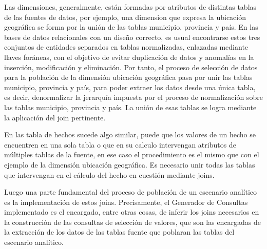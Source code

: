 Las dimensiones, generalmente, est\'an formadas por atributos de distintas tablas de las fuentes de datos, por 
ejemplo, una dimension que expresa la ubicación geográfica se forma por la uni\'on de las tablas municipio, 
provincia y pa\'is. En las bases de datos relacionales con un diseño correcto, es usual encontrarse estos 
tres conjuntos de entidades separados en tablas normalizadas, enlazadas mediante llaves for\'aneas, con el objetivo 
de evitar duplicación de datos y anomalías en la inserción, modificación y eliminación. Por tanto, el 
proceso de selección de datos para la población de la dimensión ubicación geográfica pasa por unir las 
tablas municipio, provincia y pa\'is, para poder extraer los datos desde una única tabla, es 
decir, denormalizar la jerarquía impuesta por el proceso de normalización sobre las tablas municipio, provincia
y pa\'is. La uni\'on de esas tablas se logra mediante la aplicación del join pertinente.

En las tabla de hechos sucede algo similar, puede que los valores de un hecho se encuentren en una 
sola tabla o que en su calculo intervengan atributos de múltiples tablas de la fuente, en ese caso 
el procedimiento es el mismo que con el ejemplo de la dimensión ubicación geográfica. Es necesario 
unir todas las tablas que intervengan en el cálculo del hecho en cuestión mediante joins.

Luego una parte fundamental del proceso de población de un escenario analítico es la implementación 
de estos joins. Precisamente, el Generador de Consultas implementado es el encargado, entre otras cosas, de inferir los 
joins necesarios en la construcción de las consultas de selección de valores, que son las encargadas de la 
extracción de los datos de las tablas fuente que poblaran las tablas del escenario analítico.

